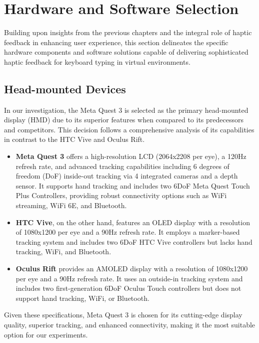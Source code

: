 \chapter{Hardware and Software Selection}
\label{sec:HardwareSoftwareSelection}

Building upon insights from the previous chapters and the integral role of haptic feedback in enhancing user experience, this section delineates the specific hardware components and software solutions capable of delivering sophisticated haptic feedback for keyboard typing in virtual environments.

\section{Head-mounted Devices}
\label{sec:HeadMountedDevices}

In our investigation, the Meta Quest 3 is selected as the primary head-mounted display (HMD) due to its superior features when compared to its predecessors and competitors. This decision follows a comprehensive analysis of its capabilities in contrast to the HTC Vive and Oculus Rift.

\begin{itemize}
    \item \textbf{Meta Quest 3} offers a high-resolution LCD (2064x2208 per eye), a 120Hz refresh rate, and advanced tracking capabilities including 6 degrees of freedom (DoF) inside-out tracking via 4 integrated cameras and a depth sensor. It supports hand tracking and includes two 6DoF Meta Quest Touch Plus Controllers, providing robust connectivity options such as WiFi streaming, WiFi 6E, and Bluetooth.
    
    \item \textbf{HTC Vive}, on the other hand, features an OLED display with a resolution of 1080x1200 per eye and a 90Hz refresh rate. It employs a marker-based tracking system and includes two 6DoF HTC Vive controllers but lacks hand tracking, WiFi, and Bluetooth.
    
    \item \textbf{Oculus Rift} provides an AMOLED display with a resolution of 1080x1200 per eye and a 90Hz refresh rate. It uses an outside-in tracking system and includes two first-generation 6DoF Oculus Touch controllers but does not support hand tracking, WiFi, or Bluetooth.
\end{itemize}
Given these specifications, Meta Quest 3 is chosen for its cutting-edge display quality, superior tracking, and enhanced connectivity, making it the most suitable option for our experiments.

